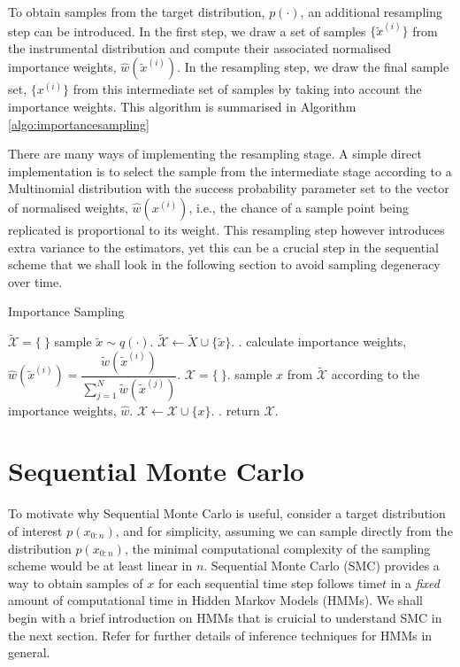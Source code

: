 To obtain samples from the target distribution, $p(\cdot)$, an additional resampling step can be introduced. In the first step, we draw a set of samples $\{\tilde{x}^{(i)}\}$ from the instrumental distribution and compute their associated normalised importance weights, $\hat{w}(\tilde{x}^{(i)})$. In the resampling step, we draw the final sample set, $\{x^{(i)}\}$ from this intermediate set of samples by taking into account the importance weights. This algorithm is summarised in Algorithm \ref{algo:importancesampling}

There are many ways of implementing the resampling stage. A simple direct implementation is to select the sample from the intermediate stage according to a Multinomial distribution with the success probability parameter set to the vector of normalised weights, $\hat{w}(x^{(i)})$, i.e., the chance of a sample point being replicated is proportional to its weight. This resampling step however introduces extra variance to the estimators, yet this can be a crucial step in the sequential scheme that we shall look in the following section to avoid sampling degeneracy over time.

\begin{algorithm}
\caption{Importance Sampling}\label{algo:importancesampling}
\begin{algorithmic}[1]
\State $\tilde{\mathcal{X}} = \{\ \}$
\Repeat
  \State sample $\tilde{x} \sim q(\cdot)$.
  \State $\tilde{\mathcal{X}} \gets \tilde{X} \cup \{\tilde{x}\}$.
.
\State calculate importance weights, $\hat{w}(\tilde{x}^{(i)})  = \dfrac{\tilde{w}(\tilde{x}^{(i)})}{\sum^N_{j=1} \tilde{w}(\tilde{x}^{(j)})}$.
\State $\mathcal{X} = \{\ \}$.
\Repeat
  \State sample $x$ from $\tilde{\mathcal{X}}$ according to the importance weights, $\hat{w}$.
  \State $\mathcal{X} \gets \mathcal{X} \cup \{x\}$.
.
\State return $\mathcal{X}$.
\EndFunction
\end{algorithmic}
\end{algorithm}

\section{Sequential Monte Carlo}
\label{sec:SMC}
To motivate why Sequential Monte Carlo is useful, consider a target distribution of interest $p(x_{0:n})$, and for simplicity, assuming we can sample directly from the distribution $p(x_{0:n})$, the minimal computational complexity of the sampling scheme would be at least linear in $n$. Sequential Monte Carlo (SMC) provides a way to obtain samples of $x$ for each sequential time step follows time$t$ in a \emph{fixed} amount of computational time in Hidden Markov Models (HMMs). We shall begin with a brief introduction on HMMs that is cruicial to understand SMC in the next section. Refer \cite{CO05} for further details of inference techniques for HMMs in general. 

